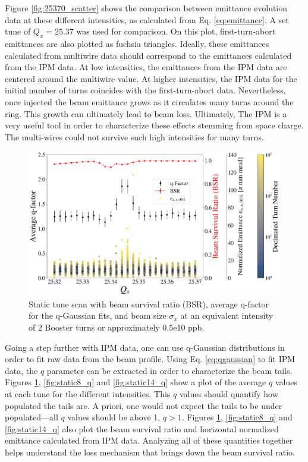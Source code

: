 Figure \ref{fig:25370_scatter} shows the comparison between emittance evolution data at these different intensities, as calculated from Eq. \ref{eq:emittance}. A set tune of $Q_x=25.37$ was used for comparison. On this plot, first-turn-abort emittances are also plotted as fuchsia triangles. Ideally, these emittances calculated from multiwire data should correspond to the emittances calculated from the IPM data. At low intensities, the emittances from the IPM data are centered around the multiwire value. At higher intensities, the IPM data for the initial number of turns coincides with the first-turn-abort data. Nevertheless, once injected the beam emittance grows as it circulates many turns around the ring. This growth can ultimately lead to beam loss. Ultimately, The IPM is a very useful tool in order to characterize these effects stemming from space charge. The multi-wires could not survive such high intensities for many turns. 

\begin{figure}[H]
    \centering
    \includegraphics[width=\columnwidth]{chapter6/static2turns_emittance_dampersOFF.png}
    \caption{Static tune scan with beam survival ratio (BSR), average q-factor for the q-Gaussian fits, and beam size $\sigma_x$ at an equivalent intensity of 2 Booster turns or approximately 0.5e10 ppb.}
    \label{fig:static2_q}
\end{figure}

Going a step further with IPM data, one can use q-Gaussian distributions in order to fit raw data from the beam profile. Using Eq. \ref{eq:qgaussian} to fit IPM data, the $q$ parameter can be extracted in order to characterize the beam tails. Figures \ref{fig:static2_q}, \ref{fig:static8_q} and \ref{fig:static14_q} show a plot of the average $q$ values at each tune for the different intensities. This $q$ values should quantify how populated the tails are. A priori, one would not expect the tails to be under populated---all $q$ values should be above 1, $q>1$. Figures \ref{fig:static2_q}, \ref{fig:static8_q} and \ref{fig:static14_q} also plot the beam survival ratio and horizontal normalized emittance calculated from IPM data. Analyzing all of these quantities together helps understand the loss mechanism that brings down the beam survival ratio. 

